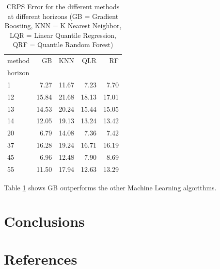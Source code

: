 \documentclass[a4paper,twocolumn,5p]{elsarticle}
\begin{document}
\begin{table}[tbp]
  \centering
  \label{tab:determ}
  \caption{CRPS Error for the different methods at different
    horizons (GB = Gradient Boosting,
    KNN = K Nearest Neighbor,
    LQR = Linear Quantile Regression,
    QRF = Quantile Random Forest)
    }
    \begin{tabular}{lrrrr}
      \toprule
      method &    GB &   KNN &   QLR &    RF \\
      horizon &       &       &       &       \\
      \midrule
      1       &  7.27 & 11.67 &  7.23 &  7.70 \\
      12      & 15.84 & 21.68 & 18.13 & 17.01 \\
      13      & 14.53 & 20.24 & 15.44 & 15.05 \\
      14      & 12.05 & 19.13 & 13.24 & 13.42 \\
      20      &  6.79 & 14.08 &  7.36 &  7.42 \\
      37      & 16.28 & 19.24 & 16.71 & 16.19 \\
      45      &  6.96 & 12.48 &  7.90 &  8.69 \\
      55      & 11.50 & 17.94 & 12.63 & 13.29 \\
      \bottomrule
      \end{tabular}
  
\end{table}


Table \ref{tab:determ} shows GB outperforms the other Machine Learning algorithms.


\section{Conclusions}
\label{sec:concl}

\section*{References}


\end{document}
